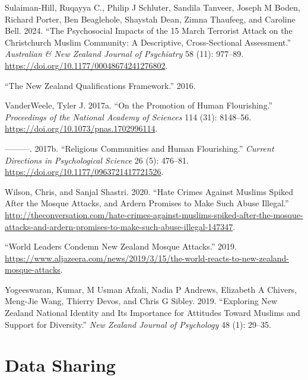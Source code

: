 \documentclass[
]{interact}
\newlength{\cslhangindent}
\newenvironment{CSLReferences}[2] %
 {\begin{list}{}{%
  \setlength{\itemindent}{0pt}
  \setlength{\leftmargin}{0pt}
  \setlength{\parsep}{0pt}
  \ifodd #1
   \setlength{\leftmargin}{\cslhangindent}
   \setlength{\itemindent}{-1\cslhangindent}
  \fi
  \setlength{\itemsep}{#2\baselineskip}}}
 {\end{list}}
\begin{document}
\begin{CSLReferences}{1}{0}
Sulaiman-Hill, Ruqayya C., Philip J Schluter, Sandila Tanveer, Joseph M
Boden, Richard Porter, Ben Beaglehole, Shaystah Dean, Zimna Thaufeeg,
and Caroline Bell. 2024. {``The Psychosocial Impacts of the 15 March
Terrorist Attack on the Christchurch Muslim Community: A Descriptive,
Cross-Sectional Assessment.''} \emph{Australian \& New Zealand Journal
of Psychiatry} 58 (11): 977--89.
\url{https://doi.org/10.1177/00048674241276802}.

{``The New Zealand Qualifications Framework.''} 2016.

VanderWeele, Tyler J. 2017a. {``On the Promotion of Human
Flourishing.''} \emph{Proceedings of the National Academy of Sciences}
114 (31): 8148--56. \url{https://doi.org/10.1073/pnas.1702996114}.

---------. 2017b. {``Religious Communities and Human Flourishing.''}
\emph{Current Directions in Psychological Science} 26 (5): 476--81.
\url{https://doi.org/10.1177/0963721417721526}.

Wilson, Chris, and Sanjal Shastri. 2020. {``Hate Crimes Against
{M}uslims Spiked After the Mosque Attacks, and {A}rdern Promises to Make
Such Abuse Illegal.''}
\url{http://theconversation.com/hate-crimes-against-muslims-spiked-after-the-mosque-attacks-and-ardern-promises-to-make-such-abuse-illegal-147347}.

{``World Leaders Condemn New Zealand Mosque Attacks.''} 2019.
\url{https://www.aljazeera.com/news/2019/3/15/the-world-reacts-to-new-zealand-mosque-attacks}.

Yogeeswaran, Kumar, M Usman Afzali, Nadia P Andrews, Elizabeth A
Chivers, Meng-Jie Wang, Thierry Devos, and Chris G Sibley. 2019.
{``Exploring {N}ew {Z}ealand National Identity and Its Importance for
Attitudes Toward {M}uslims and Support for Diversity.''} \emph{New
Zealand Journal of Psychology} 48 (1): 29--35.

\end{CSLReferences}

\newpage{}

\section{Data Sharing}\label{data-sharing}
\end{document}
